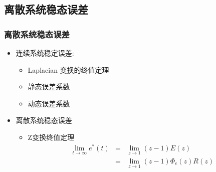 \documentclass[table]{article}
\begin{document}
\subsection{离散系统稳态误差}
\label{sec-6-1}
\begin{frame}
\frametitle{离散系统稳态误差}
\label{sec-6-1-1}

\begin{itemize}
\item 连续系统稳定误差:
\begin{itemize}
\item Laplacian 变换的终值定理
\item 静态误差系数
\item 动态误差系数
\end{itemize}
\item <2->离散系统稳态误差
\begin{itemize}
\item Z变换终值定理
      \begin{eqnarray*}
      \lim_{t\rightarrow\infty}e^*(t) & = &\lim_{z\rightarrow 1}(z-1)E(z)\\
       &=& \lim_{z\rightarrow 1}(z-1)\Phi_e(z)R(z)
      \end{eqnarray*}
\end{itemize}
\end{itemize}
\end{frame}
\end{document}
